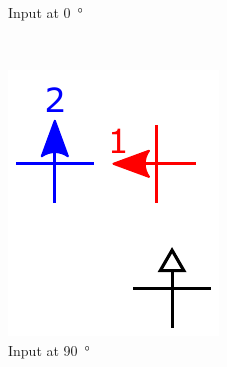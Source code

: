\documentclass[11pt,a4paper,english,twoside]{article}
\newcommand{\rulesep}{\unskip\ \vrule\ }
\begin{document}
\begin{figure}[b!]
\begin{subfigure}[t]{0.23\textwidth}
    \caption{Input at \SI{0}{\degree}}
\end{subfigure}
\rulesep
\begin{subfigure}[t]{0.23\textwidth}
    \includegraphics[width=\textwidth]{Figures/half_adder/schematic/000006_inputs_In1_0213/Input 90 deg arrowtext.pdf}
    \caption{Input at \SI{90}{\degree}}
\end{subfigure}
\rulesep
\begin{subfigure}[t]{0.23\textwidth}

\end{subfigure}
\end{figure}
\end{document}
